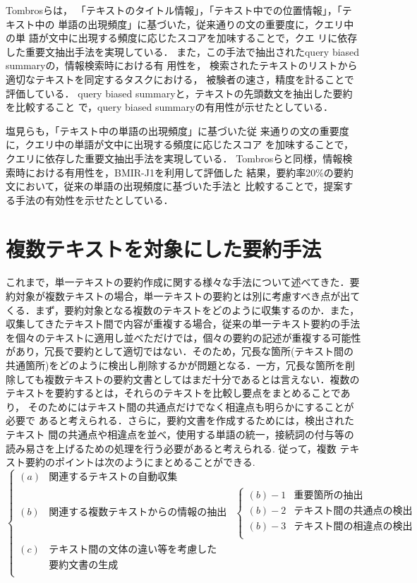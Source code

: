 Tombrosら\cite{tombros:98:b}は，
「テキストのタイトル情報」，「テキスト中での位置情報」，「テキスト中の
単語の出現頻度」に基づいた，従来通りの文の重要度に，クエリ中の単
語が文中に出現する頻度に応じたスコアを加味することで，クエ
リに依存した重要文抽出手法を実現している．
また，この手法で抽出されたquery biased summaryの，情報検索時における有
用性を，
検索されたテキストのリストから適切なテキストを同定するタスクにおける，
被験者の速さ，精度を計ることで評価している．
query biased summaryと，テキストの先頭数文を抽出した要約を比較すること
で，query biased summaryの有用性が示せたとしている．

塩見ら\cite{shiomi:98:a}も，「テキスト中の単語の出現頻度」に基づいた従
来通りの文の重要度に，クエリ中の単語が文中に出現する頻度に応じたスコア
を加味することで，クエリに依存した重要文抽出手法を実現している．
Tombrosらと同様，情報検索時における有用性を，BMIR-J1を利用して評価した
結果，要約率20\%の要約文において，従来の単語の出現頻度に基づいた手法と
比較することで，提案する手法の有効性を示せたとしている．

\vspace{2.0cm}

\section{複数テキストを対象にした要約手法}

これまで，単一テキストの要約作成に関する様々な手法について述べてきた．要
約対象が複数テキストの場合，単一テキストの要約とは別に考慮すべき点が出て
くる．まず，要約対象となる複数のテキストをどのように収集するのか．また，
収集してきたテキスト間で内容が重複する場合，従来の単一テキスト要約の手法
を個々のテキストに適用し並べただけでは，個々の要約の記述が重複する可能性
があり，冗長で要約として適切ではない．そのため，冗長な箇所(テキスト間の
共通箇所)をどのように検出し削除するかが問題となる．一方，冗長な箇所を削
除しても複数テキストの要約文書としてはまだ十分であるとは言えない．複数の
テキストを要約するとは，それらのテキストを比較し要点をまとめることであり，
そのためにはテキスト間の共通点だけでなく相違点も明らかにすることが必要で
あると考えられる．さらに，要約文書を作成するためには，検出されたテキスト
間の共通点や相違点を並べ，使用する単語の統一，接続詞の付与等の
読み易さを上げるための処理を行う必要があると考えられる.  従って，複数
テキスト要約のポイントは次のようにまとめることができる.
\[
\left\{ 
 \begin{array}{lll}
  (a) & 関連するテキストの自動収集 &\\
  (b) & 関連する複数テキストからの情報の抽出 & 
\left\{ 
 \begin{array}{ll}
  (b)-1 & 重要箇所の抽出\\
  (b)-2 & テキスト間の共通点の検出\\
  (b)-3 & テキスト間の相違点の検出\\
 \end{array}
\right.
\\
  (c) & テキスト間の文体の違い等を考慮した & \\
 & 要約文書の生成 & \\
 \end{array}
\right.
\]

